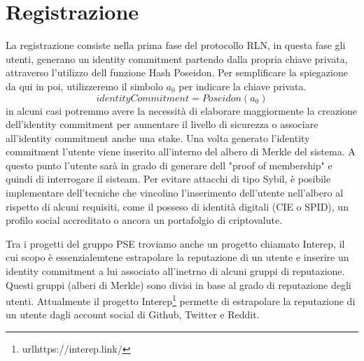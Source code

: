 \section{Registrazione}
La registrazione consiste nella prima fase del protocollo RLN, in questa fase gli utenti, generano un identity
commitment partendo dalla propria chiave privata, attraverso l'utilizzo dell funzione Hash Poseidon. Per semplificare la
spiegazione da qui in poi, utilizzeremo il simbolo $a_0$ per indicare la chiave privata.
$$identityCommitment = Poseidon(a_0)$$ 
in alcuni casi potremmo avere la necessità di elaborare maggiormente la creazione
dell'identity commitment per aumentare il livello di sicurezza o associare all'identity commitment anche una stake. Una
volta generato l'identity commitment l'utente viene inserito all'interno del albero di Merkle del sistema. A questo
punto l'utente sarà in grado di generare dell "proof of membership" e quindi di interrogare il sisteam. Per evitare
attacchi di tipo Sybil, è posibile implementare dell'tecniche che vincolino l'inserimento dell'utente nell'albero al
rispetto di alcuni requisiti, come il posseso di identità digitali (CIE o SPID), un profilo social accreditato o ancora un portafolgio di
criptovalute.

Tra i progetti del gruppo PSE troviamo anche un progetto chiamato Interep, il cui scopo è essenzialemtene estrapolare la
reputazione di un utente e inserire un identity commitment a lui associato all'inetrno di alcuni gruppi di reputazione.
Questi gruppi (alberi di Merkle) sono divisi in base al grado di reputazione degli utenti. Attualmente il progetto
Interep\footnote{url{https://interep.link/}} permette di estrapolare la reputazione di un utente dagli account social di Github, Twitter e Reddit.